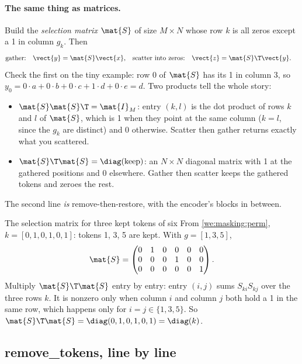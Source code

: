 \paragraph{The same thing as matrices.} Build the \emph{selection matrix}
$\mat{S}$ of size $M \times N$ whose row $k$ is all zeros except a 1 in column $g_k$. Then
\begin{align*}
\text{gather:}\quad \vect{y} &= \mat{S}\vect{x}, &
\text{scatter into zeros:}\quad \vect{z} &= \mat{S}\T \vect{y} .
\end{align*}
Check the first on the tiny example: row 0 of $\mat{S}$ has its 1 in column 3, so
$y_0 = 0 \cdot a + 0 \cdot b + 0 \cdot c + 1 \cdot d + 0 \cdot e = d$. Two products tell the whole story:
\begin{itemize}
\item $\mat{S}\mat{S}\T = \mat{I}_M$: entry $(k, l)$ is the dot product of rows $k$ and $l$ of
$\mat{S}$, which is 1 when they point at the same column ($k = l$, since the $g_k$ are distinct) and 0
otherwise. Scatter then gather returns exactly what you scattered.
\item $\mat{S}\T\mat{S} = \diag(\text{keep})$: an $N \times N$ diagonal matrix with 1 at the gathered
positions and 0 elsewhere. Gather then scatter keeps the gathered tokens and zeroes the rest.
\end{itemize}
The second line \emph{is} remove-then-restore, with the encoder's blocks in between.

\begin{worked}[label={we:masking:smatrix}]{The selection matrix for three kept tokens of six}
From \cref{we:masking:perm}, $k = [0, 1, 0, 1, 0, 1]$: tokens 1, 3, 5 are kept. With $g = [1, 3, 5]$,
\[
\mat{S} = \begin{pmatrix} 0&1&0&0&0&0\\ 0&0&0&1&0&0\\ 0&0&0&0&0&1 \end{pmatrix}.
\]
Multiply $\mat{S}\T\mat{S}$ entry by entry: entry $(i, j)$ sums $S_{ki} S_{kj}$ over the three rows $k$.
It is nonzero only when column $i$ and column $j$ both hold a 1 in the same row, which happens only for
$i = j \in \{1, 3, 5\}$. So $\mat{S}\T\mat{S} = \diag(0, 1, 0, 1, 0, 1) = \diag(k)$.
\end{worked}

\subsection{remove\_tokens, line by line}

